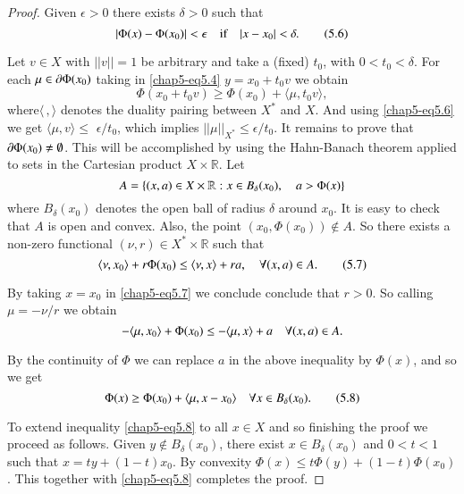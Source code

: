 \begin{proof}
Given $\epsilon>0$ there exists $\delta>0$ such that
\begin{equation*}
|\Phi(x)-\Phi(x_{0})|<\epsilon\quad\text{if}\quad
|x-x_{0}|<\delta.\tag{5.6}\label{chap5-eq5.6} 
\end{equation*}

Let $v\in X$ with $||v||=1$ be arbitrary and take a (fixed) $t_{0}$,
with $0<t_{0}<\delta$. For each $\mu\in \partial \Phi(x_{0})$ taking in
\eqref{chap5-eq5.4} $y=x_{0}+t_{0}v$ we obtain
$$
\Phi(x_{0}+t_{0}v)\geq \Phi(x_{0})+\langle\mu,t_{0}v\rangle,
$$
where\pageoriginale $\langle\,,\rangle$ denotes the duality pairing
between $X^{*}$ and $X$. And using \eqref{chap5-eq5.6} we get $\langle
\mu, v\rangle\leq$ $\epsilon/t_{0}$, which implies $||\mu||_{X^{*}}\leq
\epsilon/t_{0}$. It remains to prove that $\partial \Phi(x_{0})\neq
\emptyset$. This will be accomplished by using the Hahn-Banach theorem
applied to sets in the Cartesian product $X\times \mathbb{R}$. Let
$$
A=\{(x,a)\in X\times \mathbb{R}:x\in B_{\delta}(x_{0}),\quad a>\Phi(x)\}
$$
where $B_{\delta}(x_{0})$ denotes the open ball of radius $\delta$
around $x_{0}$. It is easy to check that $A$ is open and convex. Also,
the point $(x_{0},\Phi(x_{0}))\not\in A$. So there exists a non-zero
functional $(\nu,r)\in X^{*}\times \mathbb{R}$ such that
\begin{equation*}
\langle \nu,x_{0}\rangle+r\Phi(x_{0})\leq \langle\nu,x\rangle +ra,\quad
\forall (x,a)\in A.\tag{5.7}\label{chap5-eq5.7}
\end{equation*}

By taking $x=x_{0}$ in \eqref{chap5-eq5.7} we conclude conclude that
$r>0$. So calling $\mu=-\nu/r$ we obtain
$$
-\langle \mu, x_{0}\rangle+\Phi(x_{0})\leq
-\langle\mu,x\rangle+a\quad\forall (x,a)\in A.
$$

By the continuity of $\Phi$ we can replace $a$ in the above inequality
by $\Phi(x)$, and so we get
\begin{equation*}
\Phi(x)\geq \Phi(x_{0})+\langle \mu,x-x_{0}\rangle\quad \forall x\in
B_{\delta}(x_{0}).\tag{5.8}\label{chap5-eq5.8} 
\end{equation*}

To extend inequality \eqref{chap5-eq5.8} to all $x\in X$ and so
finishing the proof we proceed as follows. Given $y\not\in
B_{\delta}(x_{0})$, there exist $x\in B_{\delta}(x_{0})$ and $0<t<1$
such that $x=ty+(1-t)x_{0}$. By convexity $\Phi(x)\leq
t\Phi(y)+(1-t)\Phi(x_{0})$. This together with \eqref{chap5-eq5.8}
completes the proof.
\end{proof}

